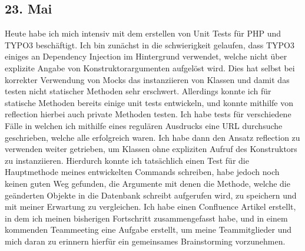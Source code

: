 \subsection{23. Mai}
Heute habe ich mich intensiv mit dem erstellen von Unit Tests für PHP und TYPO3 beschäftigt. Ich bin zunächst in die schwierigkeit gelaufen, dass TYPO3 einiges an Dependency Injection im Hintergrund verwendet, welche nicht über explizite Angabe von Konstruktorargumenten aufgelöst wird. Dies hat selbst bei korrekter Verwendung von Mocks das instanziieren von Klassen und damit das testen nicht statischer Methoden sehr erschwert. Allerdings konnte ich für statische Methoden bereits einige unit tests entwickeln, und konnte mithilfe von reflection hierbei auch private Methoden testen. Ich habe tests für verschiedene Fälle in welchen ich mithilfe eines regulären Ausdrucks eine URL durchsuche geschrieben, welche alle erfolgreich waren.
Ich habe dann den Ansatz reflection zu verwenden weiter getrieben, um Klassen ohne expliziten Aufruf des Konstruktors zu instanziieren. Hierdurch konnte ich tatsächlich einen Test für die Hauptmethode meines entwickelten Commands schreiben, habe jedoch noch keinen guten Weg gefunden, die Argumente mit denen die Methode, welche die geänderten Objekte in die Datenbank schreibt aufgerufen wird, zu speichern und mit meiner Erwartung zu vergleichen.
Ich habe einen Confluence Artikel erstellt, in dem ich meinen bisherigen Fortschritt zusammengefasst habe, und in einem kommenden Teammeeting eine Aufgabe erstellt, um meine Teammitglieder und mich daran zu erinnern hierfür ein gemeinsames Brainstorming vorzunehmen.